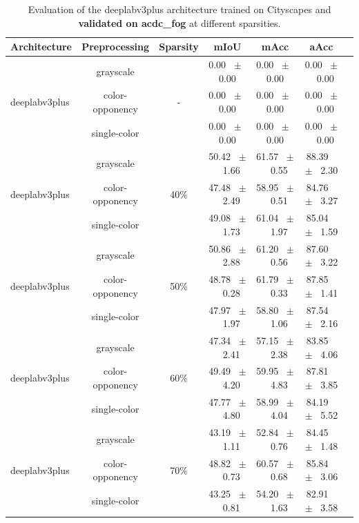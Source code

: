 \begin{table}[h]
  \centering
  \caption{Evaluation of the deeplabv3plus architecture trained on Cityscapes and \textbf{validated on acdc_fog} at different sparsities.}
  \begin{tabular}{@{}lccc ccc@{}}
    \toprule
    Architecture & Preprocessing & Sparsity & mIoU & mAcc & aAcc \\
    \midrule
    \midrule
    \midrule
    \multirow{3}{*}{deeplabv3plus} & grayscale & \multirow{3}{*}{-} & 0.00 ~$\pm$~ 0.00 & 0.00 ~$\pm$~ 0.00 & 0.00 ~$\pm$~ 0.00 \\
    & color-opponency & & 0.00 ~$\pm$~ 0.00 & 0.00 ~$\pm$~ 0.00 & 0.00 ~$\pm$~ 0.00 \\
    & single-color & & 0.00 ~$\pm$~ 0.00 & 0.00 ~$\pm$~ 0.00 & 0.00 ~$\pm$~ 0.00 \\
    \midrule
    \multirow{3}{*}{deeplabv3plus} & grayscale & \multirow{3}{*}{40\%} & 50.42 ~$\pm$~ 1.66 & 61.57 ~$\pm$~ 0.55 & 88.39 ~$\pm$~ 2.30 \\
    & color-opponency & & 47.48 ~$\pm$~ 2.49 & 58.95 ~$\pm$~ 0.51 & 84.76 ~$\pm$~ 3.27 \\
    & single-color & & 49.08 ~$\pm$~ 1.73 & 61.04 ~$\pm$~ 1.97 & 85.04 ~$\pm$~ 1.59 \\
    \midrule
    \multirow{3}{*}{deeplabv3plus} & grayscale & \multirow{3}{*}{50\%} & 50.86 ~$\pm$~ 2.88 & 61.20 ~$\pm$~ 0.56 & 87.60 ~$\pm$~ 3.22 \\
    & color-opponency & & 48.78 ~$\pm$~ 0.28 & 61.79 ~$\pm$~ 0.33 & 87.85 ~$\pm$~ 1.41 \\
    & single-color & & 47.97 ~$\pm$~ 1.97 & 58.80 ~$\pm$~ 1.06 & 87.54 ~$\pm$~ 2.16 \\
    \midrule
    \multirow{3}{*}{deeplabv3plus} & grayscale & \multirow{3}{*}{60\%} & 47.34 ~$\pm$~ 2.41 & 57.15 ~$\pm$~ 2.38 & 83.85 ~$\pm$~ 4.06 \\
    & color-opponency & & 49.49 ~$\pm$~ 4.20 & 59.95 ~$\pm$~ 4.83 & 87.81 ~$\pm$~ 3.85 \\
    & single-color & & 47.77 ~$\pm$~ 4.80 & 58.99 ~$\pm$~ 4.04 & 84.19 ~$\pm$~ 5.52 \\
    \midrule
    \multirow{3}{*}{deeplabv3plus} & grayscale & \multirow{3}{*}{70\%} & 43.19 ~$\pm$~ 1.11 & 52.84 ~$\pm$~ 0.76 & 84.45 ~$\pm$~ 1.48 \\
    & color-opponency & & 48.82 ~$\pm$~ 0.73 & 60.57 ~$\pm$~ 0.68 & 85.84 ~$\pm$~ 3.06 \\
    & single-color & & 43.25 ~$\pm$~ 0.81 & 54.20 ~$\pm$~ 1.63 & 82.91 ~$\pm$~ 3.58 \\

\end{tabular}
\end{table}
